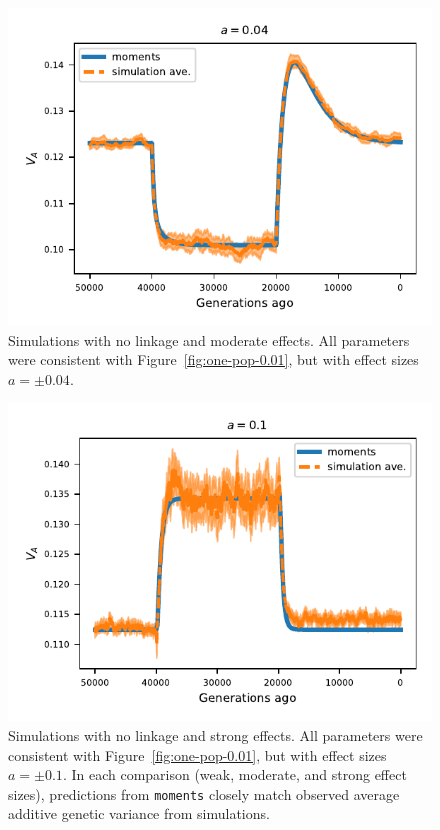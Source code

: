 \documentclass[]{article}
\newcommand{\moments}{\texttt{moments}\xspace}
\begin{document}
\begin{figure}[ht!]
    \centering
    \includegraphics{../figures/one_pop.a_0.04.pdf}
    \caption{
        Simulations with no linkage and moderate effects.
        All parameters were consistent with Figure~\ref{fig:one-pop-0.01},
        but with effect sizes $a=\pm0.04$.
    }
    \label{fig:one-pop-0.04}
\end{figure}

\begin{figure}[ht!]
    \centering
    \includegraphics{../figures/one_pop.a_0.1.pdf}
    \caption{
        Simulations with no linkage and strong effects.
        All parameters were consistent with Figure~\ref{fig:one-pop-0.01}, 
        but with effect sizes $a=\pm0.1$. In each comparison (weak, moderate,
        and strong effect sizes), predictions from \moments closely match
        observed average additive genetic variance from simulations.
    }
    \label{fig:one-pop-0.1}
\end{figure}
\end{document}
